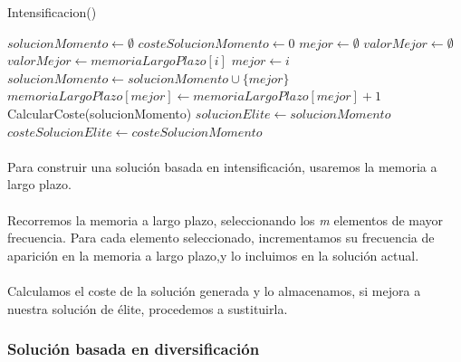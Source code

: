 \documentclass{article}
\begin{document}
	\begin{algorithm}[H]
		\caption{Intensificacion()}
		\begin{algorithmic}
			\STATE $solucionMomento \leftarrow \emptyset$
			\STATE $costeSolucionMomento \leftarrow 0$
			\STATE $mejor \leftarrow \emptyset$
			\STATE $valorMejor \leftarrow \emptyset$
			\STATE $valorMejor \leftarrow memoriaLargoPlazo[i]$
			\STATE $mejor \leftarrow i$
			\ENDIF
			\ENDFOR
			\STATE $solucionMomento \leftarrow solucionMomento \cup \{mejor\}$
			\STATE $memoriaLargoPlazo[mejor] \leftarrow memoriaLargoPlazo[mejor]+1$
			\ENDWHILE
			\STATE CalcularCoste(solucionMomento)
			\STATE $solucionElite \leftarrow solucionMomento$
			\STATE $costeSolucionElite \leftarrow costeSolucionMomento$
			\ENDIF
		\end{algorithmic}
	\end{algorithm}
	
	\paragraph{}Para construir una solución basada en intensificación, usaremos la memoria a largo plazo.
	
	\paragraph{}Recorremos la memoria a largo plazo, seleccionando los \emph{m} elementos de mayor frecuencia. Para cada elemento seleccionado, incrementamos su frecuencia de aparición en la memoria a largo plazo,y lo incluimos en la solución actual.
	
	\paragraph{}Calculamos el coste de la solución generada y lo almacenamos, si mejora a nuestra solución de élite, procedemos a sustituirla. 
	
	\subsubsection{Solución basada en diversificación}
	
\end{document}
